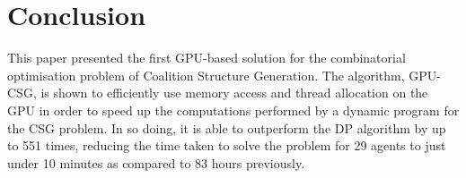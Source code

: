 \documentclass[a4paper, 12pt]{report}
\begin{document}
\section{Conclusion}
This paper presented the first GPU-based solution for the combinatorial
optimisation problem of Coalition Structure Generation. The algorithm, GPU-CSG,
is shown to efficiently use memory access and thread allocation on the GPU in
order to speed up the computations performed by a dynamic program for the CSG
problem. In so doing, it is able to outperform the DP algorithm by up to 551
times, reducing the time taken to solve the problem for 29 agents to just under
10 minutes as compared to 83 hours previously.
% 
% 
% 
\end{document}
